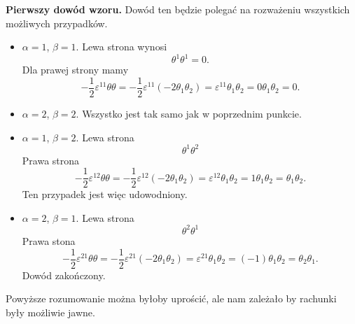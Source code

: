 \documentclass[a4paper,11pt]{article}
\begin{document}
\textbf{Pierwszy dowód wzoru.} Dowód ten będzie polegać na rozważeniu wszystkich możliwych przypadków.
\begin{itemize}
\item $\alpha = 1$, $\beta = 1$. Lewa strona wynosi
  \begin{equation}
    \label{eq:5}
    \theta^{ 1 } \theta^{ 1 } = 0.
  \end{equation}
  Dla prawej strony mamy
  \begin{equation}
    \label{eq:6}
    -\frac{ 1 }{ 2 } \varepsilon^{ 1 1 } \theta \theta =
    -\frac{ 1 }{ 2 } \varepsilon^{ 1 1 } (-2 \theta_{ 1 } \theta_{ 2 } )
    =
    \varepsilon^{ 1 1 } \theta_{ 1 } \theta_{ 2 } = 0 \theta_{ 1 } \theta_{ 2 } = 0.
  \end{equation}

\item $\alpha = 2$, $\beta = 2$. Wszystko jest tak samo jak w poprzednim punkcie.

\item $\alpha = 1$, $\beta = 2$. Lewa strona
  \begin{equation}
    \label{eq:7}
    \theta^{ 1 } \theta^{ 2 }
  \end{equation}
  Prawa strona
  \begin{equation}
    \label{eq:8}
    -\frac{ 1 }{ 2 } \varepsilon^{ 1 2 } \theta \theta
    = -\frac{ 1 }{ 2 } \varepsilon^{ 1 2 } ( -2 \theta_{ 1 } \theta_{ 2 } )
    = \varepsilon^{ 1 2 } \theta_{ 1 } \theta_{ 2 } = 1 \theta_{ 1 } \theta_{ 2 }
    = \theta_{ 1 } \theta_{ 2 }.
  \end{equation}
  Ten przypadek jest więc udowodniony.

\item $\alpha = 2$, $\beta = 1$. Lewa strona
  \begin{equation}
    \label{eq:9}
    \theta^{ 2 } \theta^{ 1 }
  \end{equation}
  Prawa stona
  \begin{equation}
    \label{eq:10}
    -\frac{ 1 }{ 2 } \varepsilon^{ 2 1 } \theta \theta
    = -\frac{ 1 }{ 2 } \varepsilon^{ 2 1 } ( -2 \theta_{ 1 } \theta_{ 2 } )
    = \varepsilon^{ 2 1 } \theta_{ 1 } \theta_{ 2 } = ( -1 ) \theta_{ 1 } \theta_{ 2 }
    = \theta_{ 2 } \theta_{ 1 }.
  \end{equation}
  Dowód zakończony.

\end{itemize}
Powyższe rozumowanie można byłoby uprościć, ale nam zależało by rachunki były możliwie jawne.
\end{document}
